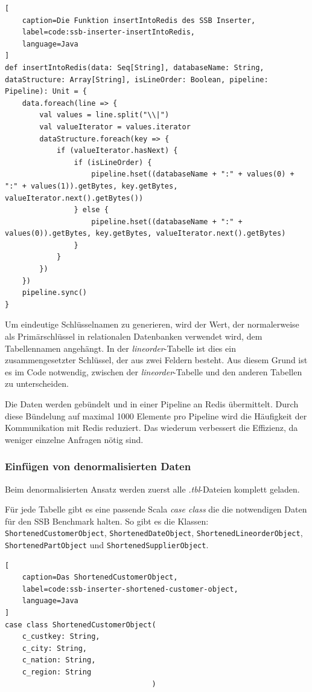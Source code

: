 \begin{lstlisting}[
    caption=Die Funktion insertIntoRedis des SSB Inserter,
    label=code:ssb-inserter-insertIntoRedis,
    language=Java
]
def insertIntoRedis(data: Seq[String], databaseName: String, dataStructure: Array[String], isLineOrder: Boolean, pipeline: Pipeline): Unit = {
	data.foreach(line => {
		val values = line.split("\\|")
		val valueIterator = values.iterator
		dataStructure.foreach(key => {
			if (valueIterator.hasNext) {
				if (isLineOrder) {
					pipeline.hset((databaseName + ":" + values(0) + ":" + values(1)).getBytes, key.getBytes, valueIterator.next().getBytes())
				} else {
					pipeline.hset((databaseName + ":" + values(0)).getBytes, key.getBytes, valueIterator.next().getBytes)
				}
			}
		})
	})
	pipeline.sync()
}
\end{lstlisting}

Um eindeutige Schlüsselnamen zu generieren, wird der Wert, der normalerweise als Primärschlüssel in relationalen Datenbanken verwendet wird, dem Tabellennamen angehängt. In der \emph{lineorder}-Tabelle ist dies ein zusammengesetzter Schlüssel, der aus zwei Feldern besteht. Aus diesem Grund ist es im Code notwendig, zwischen der \emph{lineorder}-Tabelle und den anderen Tabellen zu unterscheiden.

Die Daten werden gebündelt und in einer Pipeline an Redis übermittelt. Durch diese Bündelung auf maximal 1000 Elemente pro Pipeline wird die Häufigkeit der Kommunikation mit Redis reduziert. Das wiederum verbessert die Effizienz, da weniger einzelne Anfragen nötig sind.


\subsubsection{Einfügen von denormalisierten Daten}
Beim denormalisierten Ansatz werden zuerst alle \emph{.tbl}-Dateien komplett geladen.

Für jede Tabelle gibt es eine passende Scala \emph{case class} die die notwendigen Daten für den SSB Benchmark halten.
So gibt es die Klassen:\\
\lstinline|ShortenedCustomerObject|, \lstinline|ShortenedDateObject|, \lstinline|ShortenedLineorderObject|, \\\lstinline|ShortenedPartObject| und \lstinline|ShortenedSupplierObject|.

\begin{lstlisting}[
    caption=Das ShortenedCustomerObject,
    label=code:ssb-inserter-shortened-customer-object,
    language=Java
]
case class ShortenedCustomerObject(
	c_custkey: String,
	c_city: String,
	c_nation: String,
	c_region: String
								  )
\end{lstlisting}


